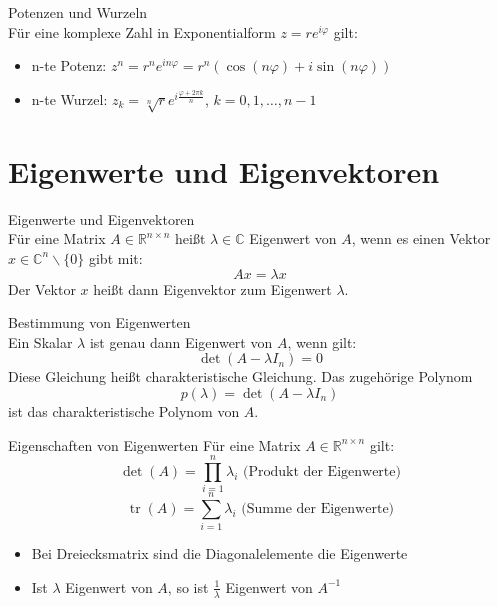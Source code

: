 \begin{theorem}{Potenzen und Wurzeln}\\
Für eine komplexe Zahl in Exponentialform $z = re^{i\varphi}$ gilt:
\begin{itemize}
    \item n-te Potenz: $z^n = r^ne^{in\varphi} = r^n(\cos(n\varphi) + i\sin(n\varphi))$
    \item n-te Wurzel: $z_k = \sqrt[n]{r}e^{i\frac{\varphi + 2\pi k}{n}}$, $k = 0,1,\ldots,n-1$
\end{itemize}
\end{theorem}


\section{Eigenwerte und Eigenvektoren}

\begin{definition}{Eigenwerte und Eigenvektoren}\\
Für eine Matrix $A \in \mathbb{R}^{n\times n}$ heißt $\lambda \in \mathbb{C}$ Eigenwert von $A$, wenn es einen Vektor $x \in \mathbb{C}^n \backslash \{0\}$ gibt mit:
\vspace{-2mm}\\
$$Ax = \lambda x$$
Der Vektor $x$ heißt dann Eigenvektor zum Eigenwert $\lambda$.
\end{definition}

\begin{concept}{Bestimmung von Eigenwerten}\\
Ein Skalar $\lambda$ ist genau dann Eigenwert von $A$, wenn gilt:
\vspace{-2mm}\\
$$\det(A - \lambda I_n) = 0$$
Diese Gleichung heißt charakteristische Gleichung. Das zugehörige Polynom
\vspace{-2mm}
$$p(\lambda) = \det(A - \lambda I_n)$$
ist das charakteristische Polynom von $A$.
\end{concept}

\begin{theorem}{Eigenschaften von Eigenwerten}
Für eine Matrix $A \in \mathbb{R}^{n\times n}$ gilt:
$$\det(A) = \prod_{i=1}^n \lambda_i \text{ (Produkt der Eigenwerte)}$$
$$\operatorname{tr}(A) = \sum_{i=1}^n \lambda_i \text{ (Summe der Eigenwerte)}$$
\begin{itemize}
    \item Bei Dreiecksmatrix sind die Diagonalelemente die Eigenwerte
    \item Ist $\lambda$ Eigenwert von $A$, so ist $\frac{1}{\lambda}$ Eigenwert von $A^{-1}$
\end{itemize}
\end{theorem}

